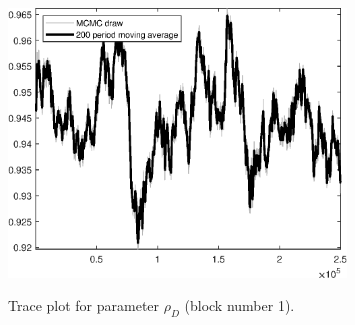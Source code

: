 \begin{figure}[H]
\centering
  \includegraphics[width=0.8\textwidth]{BRS_extended_fd/graphs/TracePlot_rho_D_blck_1}\\
    \caption{Trace plot for parameter ${\rho_D}$ (block number 1).}
\end{figure}

